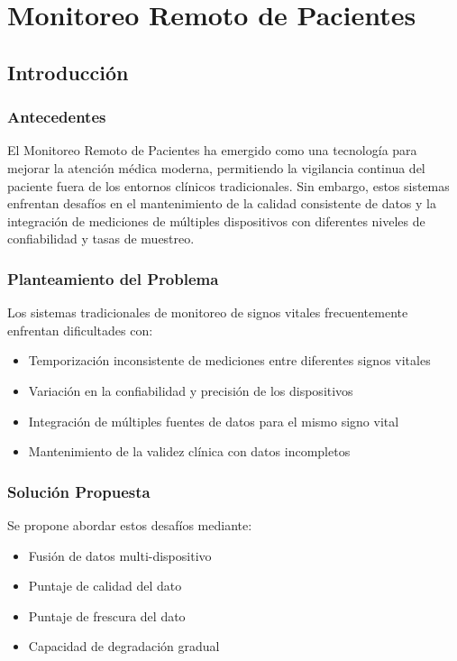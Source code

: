 \section{Monitoreo Remoto de Pacientes}

\subsection{Introducción}

\subsubsection{Antecedentes}
El Monitoreo Remoto de Pacientes ha emergido como una tecnología para mejorar la atención médica moderna, permitiendo la vigilancia continua del paciente fuera de los entornos clínicos tradicionales. 
Sin embargo, estos sistemas enfrentan desafíos en el mantenimiento de la calidad consistente de datos y la integración de mediciones de múltiples dispositivos con diferentes niveles de confiabilidad 
y tasas de muestreo.

\subsubsection{Planteamiento del Problema}
Los sistemas tradicionales de monitoreo de signos vitales frecuentemente enfrentan dificultades con:
\begin{itemize}
    \item Temporización inconsistente de mediciones entre diferentes signos vitales
    \item Variación en la confiabilidad y precisión de los dispositivos
    \item Integración de múltiples fuentes de datos para el mismo signo vital
    \item Mantenimiento de la validez clínica con datos incompletos
\end{itemize}

\newpage
\subsubsection{Solución Propuesta}
Se propone abordar estos desafíos mediante:
\begin{itemize}
    \item Fusión de datos multi-dispositivo 
    \item Puntaje de calidad del dato
    \item Puntaje de frescura del dato
    \item Capacidad de degradación gradual
\end{itemize}

